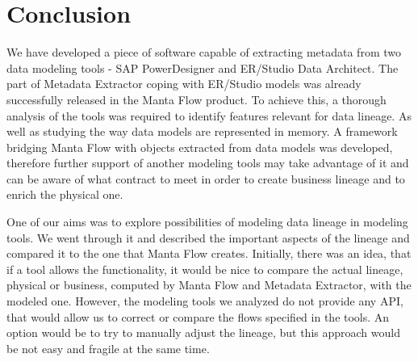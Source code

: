 \chapter*{Conclusion}
We have developed a piece of software capable of extracting metadata from two data modeling tools - SAP PowerDesigner and ER/Studio Data Architect. The part of Metadata Extractor coping with ER/Studio models was already successfully released in the Manta Flow product.
To achieve this, a thorough analysis of the tools was required to identify features relevant for data lineage. As well as studying the way data models are represented in memory.
A framework bridging Manta Flow with objects extracted from data models was developed, therefore further support of another modeling tools may take advantage of it and can be aware of what contract to meet in order to create business lineage and to enrich the physical one.

One of our aims was to explore possibilities of modeling data lineage in modeling tools.
We went through it and described the important aspects of the lineage and compared it to the one that Manta Flow creates. 
Initially, there was an idea, that if a tool allows the functionality, it would be nice to compare the actual lineage, physical or business, computed by Manta Flow and Metadata Extractor, with the modeled one. 
However, the modeling tools we analyzed do not provide any API, that would allow us to correct or compare the flows specified in the tools. 
An option would be to try to manually adjust the lineage, but this approach would be not easy and fragile at the same time.

